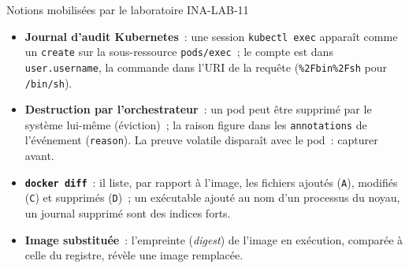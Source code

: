 \separateur

\begin{boiteRemarque}{Notions mobilisées par le laboratoire INA-LAB-11}
\begin{itemize}
    \item \textbf{Journal d'audit Kubernetes}~: une session
          \texttt{kubectl exec} apparaît comme un \texttt{create} sur la
          sous-ressource \texttt{pods/exec}~; le compte est dans
          \texttt{user.username}, la commande dans l'URI de la requête
          (\texttt{\%2Fbin\%2Fsh} pour \texttt{/bin/sh}).
    \item \textbf{Destruction par l'orchestrateur}~: un pod peut être
          supprimé par le système lui-même (éviction)~; la raison figure dans
          les \texttt{annotations} de l'événement (\texttt{reason}). La
          preuve volatile disparaît avec le pod~: capturer avant.
    \item \textbf{\texttt{docker diff}}~: il liste, par rapport à l'image,
          les fichiers ajoutés (\texttt{A}), modifiés (\texttt{C}) et
          supprimés (\texttt{D})~; un exécutable ajouté au nom d'un processus
          du noyau, un journal supprimé sont des indices forts.
    \item \textbf{Image substituée}~: l'empreinte (\emph{digest}) de l'image
          en exécution, comparée à celle du registre, révèle une image
          remplacée.
\end{itemize}
\end{boiteRemarque}

